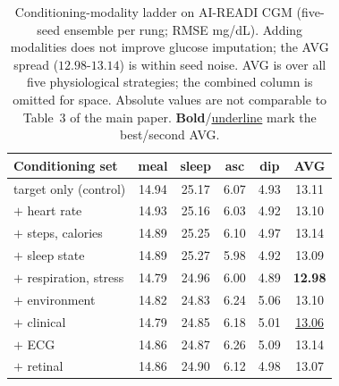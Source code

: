 \begin{table}[t]
  \centering
  {\small
  \setlength{\tabcolsep}{4pt}
  \begin{tabular}{lccccc}
    \toprule
    Conditioning set & meal & sleep & asc & dip & \textbf{AVG} \\
    \midrule
    target only (control) & 14.94 & 25.17 & 6.07 & 4.93 & 13.11 \\
    $+$ heart rate        & 14.93 & 25.16 & 6.03 & 4.92 & 13.10 \\
    $+$ steps, calories   & 14.89 & 25.25 & 6.10 & 4.97 & 13.14 \\
    $+$ sleep state       & 14.89 & 25.27 & 5.98 & 4.92 & 13.09 \\
    $+$ respiration, stress & 14.79 & 24.96 & 6.00 & 4.89 & \textbf{12.98} \\
    $+$ environment       & 14.82 & 24.83 & 6.24 & 5.06 & 13.10 \\
    $+$ clinical          & 14.79 & 24.85 & 6.18 & 5.01 & \underline{13.06} \\
    $+$ ECG               & 14.86 & 24.87 & 6.26 & 5.09 & 13.14 \\
    $+$ retinal           & 14.86 & 24.90 & 6.12 & 4.98 & 13.07 \\
    \bottomrule
  \end{tabular}}
  \caption{Conditioning-modality ladder on AI-READI CGM (five-seed ensemble per
  rung; RMSE mg/dL). Adding modalities does not improve glucose imputation; the AVG spread ($12.98$-$13.14$) is within seed noise. AVG is over all five physiological strategies; the combined column is omitted for space. Absolute values are not comparable to Table~3 of the main paper. \textbf{Bold}/\underline{underline} mark the best/second AVG.}
  \label{tab:ladder}
\end{table}

